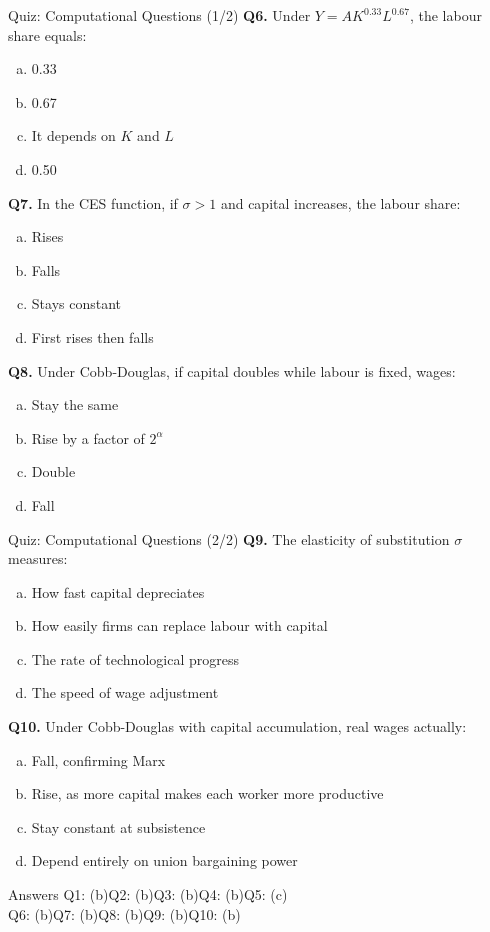 \documentclass[aspectratio=169, 10pt]{beamer}
\begin{document}
\begin{frame}{Quiz: Computational Questions (1/2)}
\textbf{Q6.} Under $Y = AK^{0.33}L^{0.67}$, the labour share equals:
\begin{enumerate}[(a)]
  \item 0.33
  \item 0.67
  \item It depends on $K$ and $L$
  \item 0.50
\end{enumerate}
\vspace{0.5em}
\textbf{Q7.} In the CES function, if $\sigma > 1$ and capital
increases, the labour share:
\begin{enumerate}[(a)]
  \item Rises
  \item Falls
  \item Stays constant
  \item First rises then falls
\end{enumerate}
\vspace{0.5em}
\textbf{Q8.} Under Cobb-Douglas, if capital doubles while labour is
fixed, wages:
\begin{enumerate}[(a)]
  \item Stay the same
  \item Rise by a factor of $2^{\alpha}$
  \item Double
  \item Fall
\end{enumerate}
\end{frame}

\begin{frame}{Quiz: Computational Questions (2/2)}
\textbf{Q9.} The elasticity of substitution $\sigma$ measures:
\begin{enumerate}[(a)]
  \item How fast capital depreciates
  \item How easily firms can replace labour with capital
  \item The rate of technological progress
  \item The speed of wage adjustment
\end{enumerate}
\vspace{0.5em}
\textbf{Q10.} Under Cobb-Douglas with capital accumulation,
real wages actually:
\begin{enumerate}[(a)]
  \item Fall, confirming Marx
  \item Rise, as more capital makes each worker more productive
  \item Stay constant at subsistence
  \item Depend entirely on union bargaining power
\end{enumerate}
\vspace{1em}
\begin{block}{Answers}
Q1: (b)\quad Q2: (b)\quad Q3: (b)\quad Q4: (b)\quad Q5: (c)\\
Q6: (b)\quad Q7: (b)\quad Q8: (b)\quad Q9: (b)\quad Q10: (b)
\end{block}
\end{frame}
\end{document}
